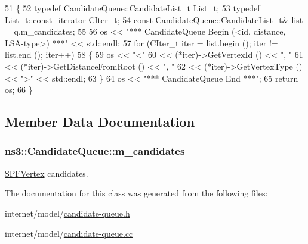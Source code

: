 \begin{DoxyCode}
51 \{
52   \textcolor{keyword}{typedef} \hyperlink{classns3_1_1CandidateQueue_a8cd2e310f0b257a519afecbf5aeb6f2e}{CandidateQueue::CandidateList\_t} List\_t;
53   \textcolor{keyword}{typedef} List\_t::const\_iterator CIter\_t;
54   \textcolor{keyword}{const} \hyperlink{classns3_1_1CandidateQueue_a8cd2e310f0b257a519afecbf5aeb6f2e}{CandidateQueue::CandidateList\_t}& \hyperlink{openflow-interface_8h_afd9bcfa176617760671b67580f536fa7}{list} = q.m\_candidates;
55 
56   os << \textcolor{stringliteral}{"*** CandidateQueue Begin (<id, distance, LSA-type>) ***"} << std::endl;
57   \textcolor{keywordflow}{for} (CIter\_t iter = list.begin (); iter != list.end (); iter++)
58     \{
59       os << \textcolor{stringliteral}{"<"} 
60       << (*iter)->GetVertexId () << \textcolor{stringliteral}{", "}
61       << (*iter)->GetDistanceFromRoot () << \textcolor{stringliteral}{", "}
62       << (*iter)->GetVertexType () << \textcolor{stringliteral}{">"} << std::endl;
63     \}
64   os << \textcolor{stringliteral}{"*** CandidateQueue End ***"};
65   \textcolor{keywordflow}{return} os;
66 \}
\end{DoxyCode}


\subsection{Member Data Documentation}
\subsubsection[{\texorpdfstring{m\+\_\+candidates}{m_candidates}}]{ ns3\+::\+Candidate\+Queue\+::m\+\_\+candidates\hspace{0.3cm}{\ttfamily [private]}}\hypertarget{classns3_1_1CandidateQueue_ad07c79907f38c5da1e0b9761511de52a}{}\label{classns3_1_1CandidateQueue_ad07c79907f38c5da1e0b9761511de52a}


\hyperlink{classns3_1_1SPFVertex}{S\+P\+F\+Vertex} candidates. 



The documentation for this class was generated from the following files\+:\begin{DoxyCompactItemize}
\item 
internet/model/\hyperlink{candidate-queue_8h}{candidate-\/queue.\+h}\item 
internet/model/\hyperlink{candidate-queue_8cc}{candidate-\/queue.\+cc}\end{DoxyCompactItemize}
